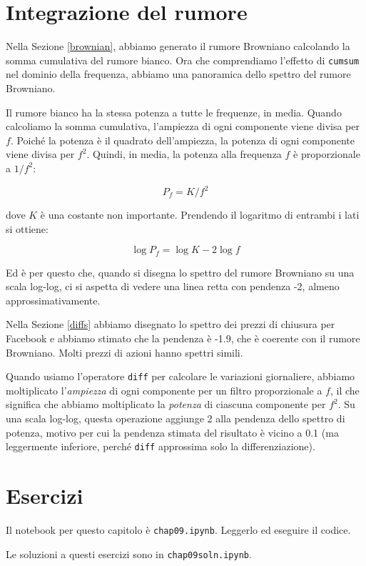 \documentclass[12pt]{book} \usepackage[width=5.5in,height=8.5in, hmarginratio=3:2,vmarginratio=1:1]{geometry}
\begin{document}
\section{Integrazione del rumore} 

Nella Sezione \ref{brownian}, abbiamo generato il rumore Browniano calcolando la somma cumulativa del rumore bianco. Ora che comprendiamo l'effetto di {\tt cumsum} nel dominio della frequenza, abbiamo una panoramica dello spettro del rumore Browniano.

Il rumore bianco ha la stessa potenza a tutte le frequenze, in media. Quando calcoliamo la somma cumulativa, l'ampiezza di ogni componente viene divisa per $f$. Poiché la potenza è il quadrato dell'ampiezza, la potenza di ogni componente viene divisa per $f^2$. Quindi, in media, la potenza alla frequenza $f$ è proporzionale a $1 / f^2$:

%
\[ P_f = K / f^2 \] 

%
dove $K$ è una costante non importante. Prendendo il logaritmo di entrambi i lati si ottiene:

%
\[ \log P_f = \log K - 2 \log f \] 

%
Ed è per questo che, quando si disegna lo spettro del rumore Browniano su una scala log-log, ci si aspetta di vedere una linea retta con pendenza -2, almeno approssimativamente.

Nella Sezione \ref{diffs} abbiamo disegnato lo spettro dei prezzi di chiusura per Facebook e abbiamo stimato che la pendenza è -1.9, che è coerente con il rumore Browniano. Molti prezzi di azioni hanno spettri simili.

Quando usiamo l'operatore {\tt diff} per calcolare le variazioni giornaliere, abbiamo moltiplicato l'{\em ampiezza} di ogni componente per un filtro proporzionale a $f$, il che significa che abbiamo moltiplicato la {\em potenza} di ciascuna componente per $f^2$. Su una scala log-log, questa operazione aggiunge 2 alla pendenza dello spettro di potenza, motivo per cui la pendenza stimata del risultato è vicino a 0.1 (ma leggermente inferiore, perché {\tt diff} approssima solo la differenziazione).

\section{Esercizi} 

Il notebook per questo capitolo è {\tt chap09.ipynb}. Leggerlo ed eseguire il codice.

Le soluzioni a questi esercizi sono in {\tt chap09soln.ipynb}.
\end{document}
